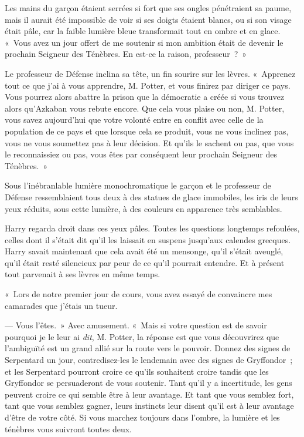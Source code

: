 Les mains du garçon étaient serrées si fort que ses ongles pénétraient sa paume, mais il aurait été impossible de voir si ses doigts étaient blancs, ou si son visage était pâle, car la faible lumière bleue transformait tout en ombre et en glace. «~Vous avez un jour offert de me soutenir si mon ambition était de devenir le prochain Seigneur des Ténèbres. En est-ce la raison, professeur~?~»

Le professeur de Défense inclina sa tête, un fin sourire sur les lèvres. «~Apprenez tout ce que j'ai à vous apprendre, M. Potter, et vous finirez par diriger ce pays. Vous pourrez alors abattre la prison que la démocratie a créée si vous trouvez alors qu'Azkaban vous rebute encore. Que cela vous plaise ou non, M. Potter, vous savez aujourd'hui que votre volonté entre en conflit avec celle de la population de ce pays et que lorsque cela se produit, vous ne vous inclinez pas, vous ne vous soumettez pas à leur décision. Et qu'ils le sachent ou pas, que vous le reconnaissiez ou pas, vous êtes par conséquent leur prochain Seigneur des Ténèbres.~»

Sous l'inébranlable lumière monochromatique le garçon et le professeur de Défense ressemblaient tous deux à des statues de glace immobiles, les iris de leurs yeux réduits, sous cette lumière, à des couleurs en apparence très semblables.

Harry regarda droit dans ces yeux pâles. Toutes les questions longtemps refoulées, celles dont il s'était dit qu'il les laissait en suspens jusqu'aux calendes grecques. Harry savait maintenant que cela avait été un mensonge, qu'il s'était aveuglé, qu'il était resté silencieux par peur de ce qu'il pourrait entendre. Et à présent tout parvenait à ses lèvres en même temps.

«~Lors de notre premier jour de cours, vous avez essayé de convaincre mes camarades que j'étais un tueur.

--- Vous l'êtes.~» Avec amusement. «~Mais si votre question est de savoir pourquoi je le leur ai \emph{dit}, M. Potter, la réponse est que vous découvrirez que l'ambiguïté est un grand allié sur la route vers le pouvoir. Donnez des signes de Serpentard un jour, contredisez-les le lendemain avec des signes de Gryffondor~; et les Serpentard pourront croire ce qu'ils souhaitent croire tandis que les Gryffondor se persuaderont de vous soutenir. Tant qu'il y a incertitude, les gens peuvent croire ce qui semble être à leur avantage. Et tant que vous semblez fort, tant que vous semblez gagner, leurs instincts leur disent qu'il est à leur avantage d'être de votre côté. Si vous marchez toujours dans l'ombre, la lumière et les ténèbres vous suivront toutes deux.

